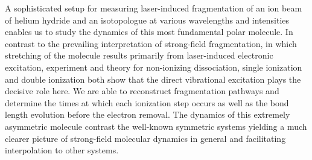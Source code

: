 A sophisticated setup for measuring laser-induced fragmentation of an ion beam of helium hydride and an isotopologue at various wavelengths and intensities enables us to study the dynamics of this most fundamental polar molecule. In contrast to the prevailing interpretation of strong-field fragmentation, in which stretching of the molecule results primarily from laser-induced electronic excitation, experiment and theory for non-ionizing dissociation, single ionization and double ionization both show that the direct vibrational excitation plays the decisive role here. We are able to reconstruct fragmentation pathways and determine the times at which each ionization step occurs as well as the bond length evolution before the electron removal. The dynamics of this extremely asymmetric molecule contrast the well-known symmetric systems yielding a much clearer picture of strong-field molecular dynamics in general and facilitating interpolation to other systems. 

\vspace{\baselineskip}